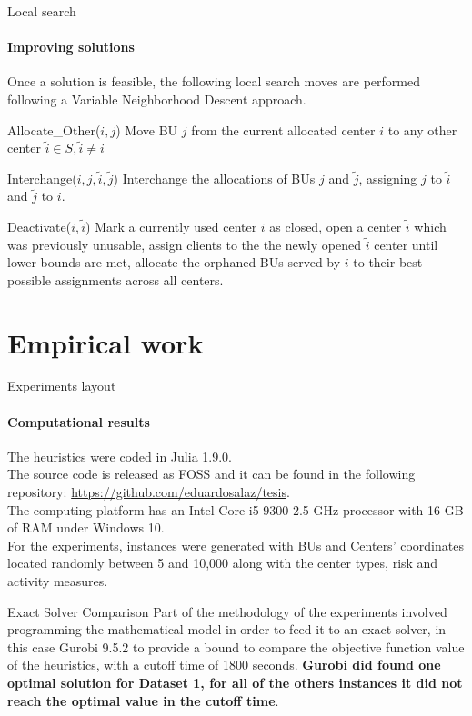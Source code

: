 \documentclass{beamer}
\begin{document}
\begin{frame}{Local search}
    \framesubtitle{Improving solutions}
    \scriptsize Once a solution is feasible, the following local search moves are performed following a Variable Neighborhood Descent approach.
        \begin{block}{Allocate\_Other($i, j$)}
        \centering
         \footnotesize Move BU $j$ from the current allocated center $i$ to any other center $\tilde{i} \in S, \tilde{i} \ne i$
    \end{block}
    \begin{block}{Interchange($i, j, \tilde{i}, \tilde{j}$)}
        \centering \footnotesize
        Interchange the allocations of BUs $j$ and $\tilde{j}$, assigning $j$ to $\tilde{i}$ and $\tilde{j}$ to $i$.
    \end{block}
    \begin{block}{Deactivate($i, \tilde{i}$)}
        \centering \footnotesize
        Mark a currently used center $i$ as closed, open a center $\tilde{i}$ which was previously unusable, assign clients to the the newly opened $\tilde{i}$ center until lower bounds are met, allocate the orphaned BUs served by $i$ to their best possible assignments across all centers.
    \end{block}
\end{frame}

\section{Empirical work}

\begin{frame}{Experiments layout}
    \framesubtitle{Computational results}
    The heuristics were coded in Julia 1.9.0. \\
    The source code is released as FOSS and it can be found in the following repository: \url{https://github.com/eduardosalaz/tesis}.\\
    The computing platform has an Intel Core i5-9300 2.5 GHz processor with 16 GB of RAM under Windows 10.\\
    For the experiments, instances were generated with BUs and Centers' coordinates located randomly between 5 and 10,000 along with the center types, risk and activity measures.
\end{frame}

\begin{frame}{Exact Solver Comparison}
    Part of the methodology of the experiments involved programming the mathematical model in order to feed it to an exact solver, in this case Gurobi 9.5.2 to provide a bound to compare the objective function value of the heuristics, with a cutoff time of 1800 seconds. \textbf{Gurobi did found one optimal solution for Dataset 1, for all of the others instances it did not reach the optimal value in the cutoff time}.
\end{frame}
\end{document}
